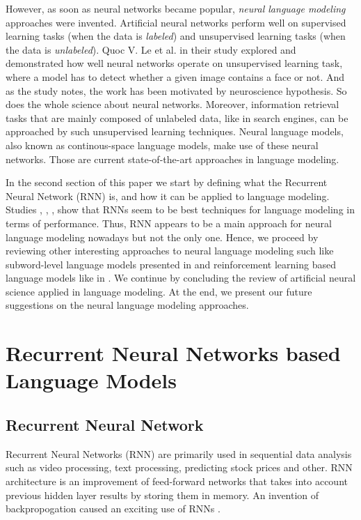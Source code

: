 \documentclass{IEEEtran}
\begin{document}
However, as soon as neural networks became popular, \textit{neural language modeling} approaches were invented. Artificial neural networks perform well on supervised learning tasks (when the data is \textit{labeled}) and unsupervised learning tasks (when the data is \textit{unlabeled}). Quoc V. Le et al. in their study \cite{unsupervised} explored and demonstrated how well neural networks operate on unsupervised learning task, where a model has to detect whether a given image contains a face or not. And as the study \cite{unsupervised} notes, the work has been motivated by neuroscience hypothesis. So does the whole science about neural networks. Moreover, information retrieval tasks that are mainly composed of unlabeled data, like in search engines, can be approached by such unsupervised learning techniques. Neural language models, also known as continous-space language models, make use of these neural networks. Those are current state-of-the-art approaches in language modeling.

In the second section of this paper we start by defining what the Recurrent Neural Network (RNN) is, and how it can be applied to language modeling. Studies \cite{Mikolov2010NeuralLM}, \cite{Mikolov2011ExtensionsOR}, \cite{Zaremba2014LSTM}, \cite{Salakhutdinov2017Softmax} show that RNNs seem to be best techniques for language modeling in terms of performance. Thus, RNN appears to be a main approach for neural language modeling nowadays but not the only one. Hence, we proceed by reviewing other interesting approaches to neural language modeling such like subword-level language models presented in \cite{Mikolov2011SubwordLM} and reinforcement learning based language models like in \cite{Quoc2017Reinforcement}. We continue by concluding the review of artificial neural science applied in language modeling. At the end, we present our future suggestions on the neural language modeling approaches. 

\section{Recurrent Neural Networks based Language Models}

\subsection{Recurrent Neural Network}

Recurrent Neural Networks (RNN) are primarily used in sequential data analysis such as video processing, text processing, predicting stock prices and other. RNN architecture is an improvement of feed-forward networks that takes into account previous hidden layer results by storing them in memory. An invention of backpropogation caused an exciting use of RNNs \cite{deeplearning}.
\end{document}
